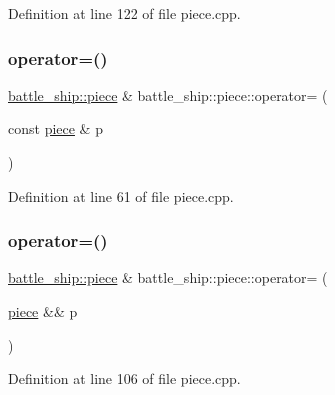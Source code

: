 Definition at line 122 of file piece.\+cpp.

\mbox{\label{classbattle__ship_1_1piece_a1147437e97aef00c52f9255a47e87732}} 
\subsubsection{\texorpdfstring{operator=()}{operator=()}\hspace{0.1cm}{\footnotesize\ttfamily [1/2]}}
{\footnotesize\ttfamily \hyperlink{classbattle__ship_1_1piece}{battle\+\_\+ship\+::piece} \& battle\+\_\+ship\+::piece\+::operator= (\begin{DoxyParamCaption}\item[{const \hyperlink{classbattle__ship_1_1piece}{piece} \&}]{p }\end{DoxyParamCaption})}



Definition at line 61 of file piece.\+cpp.

\mbox{\label{classbattle__ship_1_1piece_a683a77d137a80eb7b4780c83bfe92b9a}} 
\subsubsection{\texorpdfstring{operator=()}{operator=()}\hspace{0.1cm}{\footnotesize\ttfamily [2/2]}}
{\footnotesize\ttfamily \hyperlink{classbattle__ship_1_1piece}{battle\+\_\+ship\+::piece} \& battle\+\_\+ship\+::piece\+::operator= (\begin{DoxyParamCaption}\item[{\hyperlink{classbattle__ship_1_1piece}{piece} \&\&}]{p }\end{DoxyParamCaption})}



Definition at line 106 of file piece.\+cpp.

\mbox{\label{classbattle__ship_1_1piece_a348b7b4c82f37d9668d0cb85e1105129}} 
